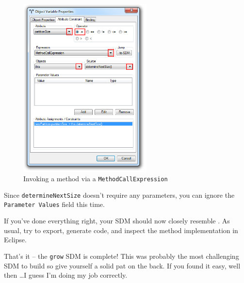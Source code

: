 \begin{stepbystep}
\begin{figure}[htbp]
\begin{center}
  \includegraphics[width=0.6\textwidth]{../../org.moflon.doc.handbook.03_storyDiagrams/08_growBox/visGBImages/ea_attributeMethodCall}
  \caption{Invoking a method via a \texttt{MethodCallExpression}}  
  \label{ea:sdm_methodCallExpr} 
\end{center}
\end{figure}

\item Since \texttt{determineNextSize} doesn't require any parameters, you can ignore the \texttt{Parameter Values} field this time. 

\vspace{0.5cm}

\item If you've done everything right, your SDM should now closely resemble . As usual, try to export,
generate code, and inspect the method implementation in Eclipse.

\vspace{0.5cm}

\item  That's it -- the \texttt{grow} SDM is complete! This was probably the most challenging SDM to build so give yourself a solid 
pat on the back. If you found it easy, well then \ldots I guess I'm doing my job correctly.

\vspace{0.5cm}


\end{stepbystep}
